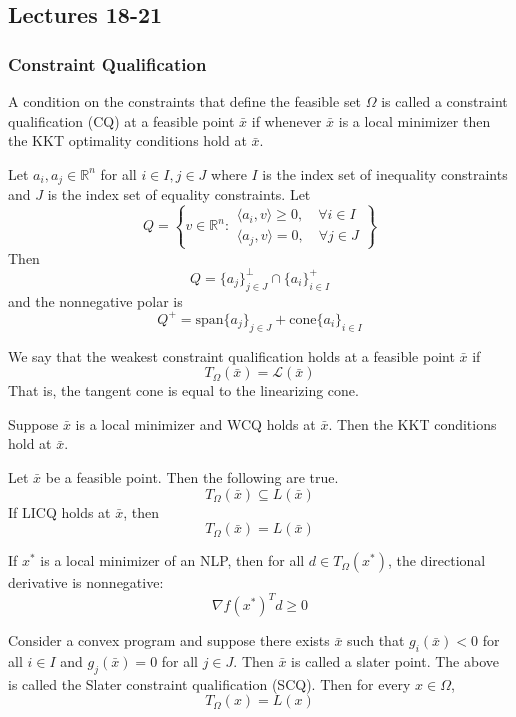 \subsection{Lectures 18-21}
\subsubsection{Constraint Qualification}
\begin{definition}
    A condition on the constraints that define the feasible set $\Omega$ is called a constraint qualification (CQ) at a feasible point $\bar x$ if whenever $\bar x$ is a local minimizer then the KKT optimality conditions hold at $\bar x$.
\end{definition}
\begin{lemma}
    Let $a_i, a_j \in \mathbb R^n$ for all $i \in I, j \in J$ where $I$ is the index set of inequality constraints and $J$ is the index set of equality constraints. Let
    $$Q = \left\{v \in \mathbb R^n : \substack{\langle a_i, v \rangle \geq 0, \quad \forall i \in I \\ \langle a_j, v \rangle = 0 , \quad \forall j \in J}\right\}$$
    Then
    $$Q = \{a_j\}^\perp_{j \in J} \cap \{a_i\}^+_{i \in I}$$
    and the nonnegative polar is
    $$Q^+ = \text{span}\{a_j\}_{j \in J} + \text{cone}\{a_i\}_{i \in I}$$
\end{lemma}
\begin{definition}
    We say that the weakest constraint qualification holds at a feasible point $\bar x$ if $$T_\Omega(\bar x) = \mathcal L(\bar x)$$
    That is, the tangent cone is equal to the linearizing cone.
\end{definition}
\begin{theorem}[]
    Suppose $\bar x$ is a local minimizer and WCQ holds at $\bar x$. Then the KKT conditions hold at $\bar x$.
\end{theorem}
\begin{theorem}[]
    Let $\bar x$ be a feasible point. Then the following are true.
    $$T_\Omega(\bar x) \subseteq L(\bar x)$$
    If LICQ holds at $\bar x$, then $$T_\Omega(\bar x) = L(\bar x)$$
\end{theorem}
\begin{theorem}[]
    If $x^*$ is a local minimizer of an NLP, then for all $d \in T_\Omega(x^*)$, the directional derivative is nonnegative: $$\nabla f(x^*)^Td \geq 0$$
\end{theorem}
\begin{definition}
    Consider a convex program and suppose there exists $\bar x$ such that $g_i(\bar x) < 0$ for all $i \in I$ and $g_j(\bar x) = 0$ for all $j \in J$. Then $\bar x$ is called a slater point. The above is called the Slater constraint qualification (SCQ). Then for every $x \in \Omega$, $$T_\Omega(x) = L(x)$$
\end{definition}
